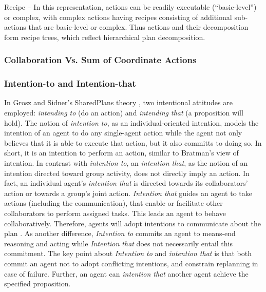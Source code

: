 \documentclass[11pt]{article}
\begin{document}
Recipe -- In this representation, actions can be readily executable
(“basic-level”) or complex, with complex actions having recipes consisting of
additional sub-actions that are basic-level or complex. Thus actions and their
decomposition form recipe trees, which reflect hierarchical plan decomposition.


\subsubsection{Collaboration Vs. Sum of Coordinate Actions}

\cite{grosz:collaborative-systems}

\subsubsection{Intention-to and Intention-that}
\label{sec:intend-to-that}

In Grosz and Sidner's SharedPlans theory \cite{grosz:plans-discourse}, two
intentional attitudes are employed: \textit{intending to} (do an action) and
\textit{intending that} (a proposition will hold). The notion of
\textit{intention to}, as an individual-oriented intention, models the intention
of an agent to do any single-agent action while the agent not only believes that
it is able to execute that action, but it also committs to doing so. In short,
it is an intention to perform an action, similar to Bratman's view of intention.
In contrast with \textit{intention to}, an \textit{intention that}, as the
notion of an intention directed toward group activity, does not directly imply
an action. In fact, an individual agent's \textit{intention that} is directed
towards its collaborators' action or towards a group's joint action.
\textit{Intention that} guides an agent to take actions (including the
communication), that enable or facilitate other collaborators to perform
assigned tasks. This leads an agent to behave collaboratively. Therefore, agents
will adopt intentions to communicate about the plan \cite{grosz:collaboration}.
As another difference, \textit{Intention to} commits an agent to means-end
reasoning and acting \cite{bratman:intentions-plans} while \textit{Intention
that} does not necessarily entail this commitment. The key point about
\textit{Intention to} and \textit{intention that} is that both commit an agent
not to adopt conflicting intentions, and constrain replanning in case of
failure. Further, an agent can \textit{intention that} another agent achieve the
specified proposition.
\end{document}

